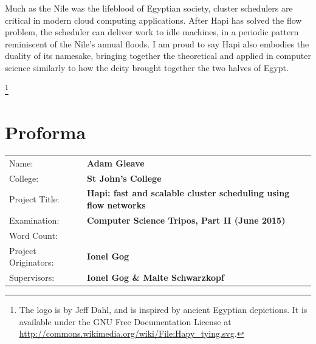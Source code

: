 \documentclass[12pt,a4paper,twoside,notitlepage]{report}
\theoremstyle{plain}
\theoremstyle{definition}
\theoremstyle{remark}
\newcommand\blfootnote[1]{%
    \begingroup
    \renewcommand\thefootnote{}\footnote{#1}%
    \addtocounter{footnote}{-1}%
    \endgroup
}
\begin{document}
Much as the Nile was the lifeblood of Egyptian society, cluster schedulers are critical in modern cloud computing applications. After Hapi has solved the flow problem, the scheduler can deliver work to idle machines, in a periodic pattern reminiscent of the Nile's annual floods. I am proud to say Hapi also embodies the duality of its namesake, bringing together the theoretical and applied in computer science similarly to how the deity brought together the two halves of Egypt.



\blfootnote{The logo is by Jeff Dahl, and is inspired by ancient Egyptian depictions. It is available under the GNU Free Documentation License at \url{http://commons.wikimedia.org/wiki/File:Hapy_tying.svg}.}

\vspace*{\fill}


\setcounter{page}{1}
\pagestyle{plain}
\chapter*{Proforma}
\vspace*{-2em}
{
	\begin{tabular}{ll}
		Name:			        & \textbf{Adam Gleave}					\\
		College:		        & \textbf{St John's College}\\
        Project Title:	        & \textbf{Hapi: fast and scalable cluster scheduling using flow networks}\\
		Examination:	        & \textbf{Computer Science Tripos, Part II (June 2015)}\\
        Word Count:		        & \textbf{ \unskip}\\
		Project Originators:	& \textbf{Ionel Gog}\\
        Supervisors:	        & \textbf{Ionel Gog \& Malte Schwarzkopf}\\
	\end{tabular}
}
\end{document}
